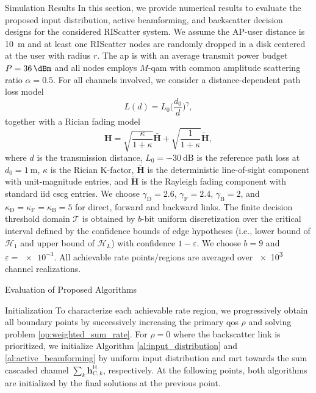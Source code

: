 \documentclass[journal]{IEEEtran}
\begin{document}
\begin{section}{Simulation Results}
	In this section, we provide numerical results to evaluate the proposed input distribution, active beamforming, and backscatter decision designs for the considered RIScatter system.
	We assume the AP-user distance is \qty{10}{\meter} and at least one RIScatter nodes are randomly dropped in a disk centered at the user with radius $r$.
	The \gls{ap} is with an average transmit power budget $P=\qty{36}{\dBm}$ and all nodes employs $M$-\gls{qam} with common amplitude scattering ratio $\alpha=0.5$.
	For all channels involved, we consider a distance-dependent path loss model
	\begin{equation}
		L(d) = L_0 \biggl(\frac{d_0}{d}\biggr)^\gamma,
	\end{equation}
	together with a Rician fading model
	\begin{equation}
		\boldsymbol{H} = \sqrt{\frac{\kappa}{1+\kappa}} \bar{\boldsymbol{H}} + \sqrt{\frac{1}{1+\kappa}} \tilde{\boldsymbol{H}},
	\end{equation}
	where $d$ is the transmission distance, $L_0=-\qty{30}{\dB}$ is the reference path loss at $d_0=\qty{1}{\meter}$, $\kappa$ is the Rician K-factor, $\bar{\boldsymbol{H}}$ is the deterministic line-of-sight component with unit-magnitude entries, and $\tilde{\boldsymbol{H}}$ is the Rayleigh fading component with standard \gls{iid} \gls{cscg} entries.
	We choose $\gamma_{\text{D}}=2.6$, $\gamma_{\text{F}}=2.4$, $\gamma_{\text{B}}=2$, and $\kappa_{\text{D}}=\kappa_{\text{F}}=\kappa_{\text{B}}=5$ for direct, forward and backward links.
	The finite decision threshold domain $\mathcal{T}$ is obtained by $b$-bit uniform discretization over the critical interval defined by the confidence bounds of edge hypotheses (i.e., lower bound of $\mathcal{H}_1$ and upper bound of $\mathcal{H}_L$) with confidence $1-\varepsilon$.
	We choose $b=9$ and $\varepsilon=\num{e-3}$.
	All achievable rate points/regions are averaged over \num{e3} channel realizations.

	\begin{subsection}{Evaluation of Proposed Algorithms}
		\begin{subsubsection}{Initialization}
			To characterize each achievable rate region, we progressively obtain all boundary points by successively increasing the primary \gls{qos} $\rho$ and solving problem \eqref{op:weighted_sum_rate}.
			For $\rho=0$ where the backscatter link is prioritized, we initialize Algorithm \ref{al:input_distribution} and \ref{al:active_beamforming} by uniform input distribution and \gls{mrt} towards the sum cascaded channel $\sum_{k} \boldsymbol{h}_{\text{C},k}^\mathsf{H}$, respectively.
			At the following points, both algorithms are initialized by the final solutions at the previous point.
		\end{subsubsection}


\end{subsection}
\end{section}
\end{document}
